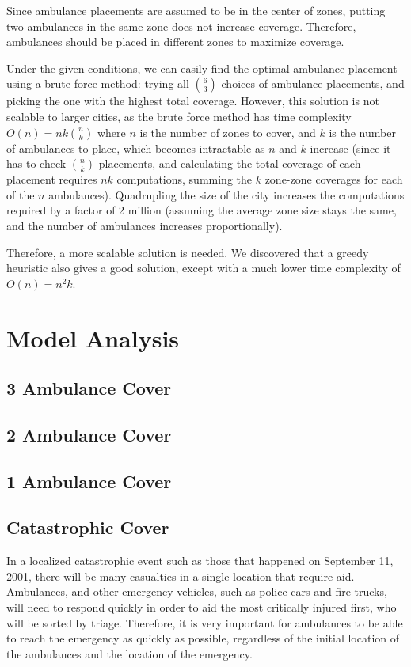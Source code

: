 \documentclass[notitlepage, 12pt]{article}
\begin{document}
Since ambulance placements are assumed to be in the center of zones, putting two ambulances in the same
zone does not increase coverage. Therefore, ambulances should be placed in different zones to maximize
coverage.

Under the given conditions, we can easily find the optimal ambulance placement using a brute force
method: trying all $\binom{6}{3}$ choices of ambulance placements, and picking the one with the highest total coverage.
However, this solution is not scalable to larger cities, as the brute force method has time complexity
$O(n) = nk\binom{n}{k}$ where $n$ is the number of zones to cover, and $k$ is the number of ambulances to place, which
becomes intractable as $n$ and $k$ increase (since it has to check $\binom{n}{k}$ placements,
and calculating the total coverage of each placement requires $nk$ computations, summing the $k$ zone-zone
coverages for each of the $n$ ambulances). Quadrupling the size of the city
increases the computations required by a factor of 2 million (assuming the average zone size stays the same,
and the number of ambulances increases proportionally).

Therefore, a more scalable solution is needed. We discovered that a greedy heuristic also gives a good solution,
except with a much lower time complexity of $O(n) = n^2k$.

\section{Model Analysis}

\subsection{3 Ambulance Cover}

\subsection{2 Ambulance Cover}

\subsection{1 Ambulance Cover}

\subsection{Catastrophic Cover}
In a localized catastrophic event such as those that happened on September 11, 2001, there will be
many casualties in a single location that require aid. Ambulances, and other emergency vehicles,
such as police cars and fire trucks, will need to respond quickly in order to aid the most critically
injured first, who will be sorted by triage. Therefore, it is very important for ambulances to be able to
reach the emergency as quickly as possible, regardless of the initial location of the ambulances and the
location of the emergency.
\end{document}
